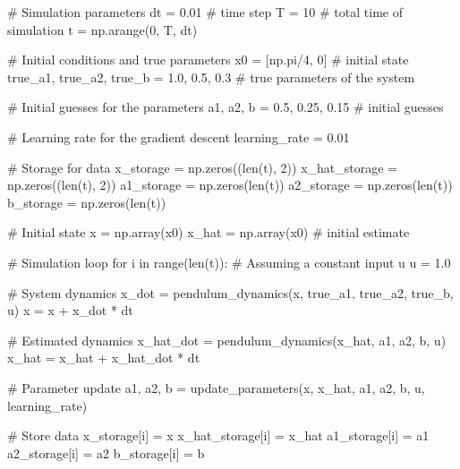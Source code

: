 \documentclass{article}
\begin{document}
\begin{python}
# Simulation parameters
dt = 0.01  # time step
T = 10     # total time of simulation
t = np.arange(0, T, dt)

# Initial conditions and true parameters
x0 = [np.pi/4, 0]  # initial state
true_a1, true_a2, true_b = 1.0, 0.5, 0.3  # true parameters of the system

# Initial guesses for the parameters
a1, a2, b = 0.5, 0.25, 0.15  # initial guesses

# Learning rate for the gradient descent
learning_rate = 0.01

# Storage for data
x_storage = np.zeros((len(t), 2))
x_hat_storage = np.zeros((len(t), 2))
a1_storage = np.zeros(len(t))
a2_storage = np.zeros(len(t))
b_storage = np.zeros(len(t))

# Initial state
x = np.array(x0)
x_hat = np.array(x0)  # initial estimate

# Simulation loop
for i in range(len(t)):
    # Assuming a constant input u
    u = 1.0

    # System dynamics
    x_dot = pendulum_dynamics(x, true_a1, true_a2, true_b, u)
    x = x + x_dot * dt

    # Estimated dynamics
    x_hat_dot = pendulum_dynamics(x_hat, a1, a2, b, u)
    x_hat = x_hat + x_hat_dot * dt

    # Parameter update
    a1, a2, b = update_parameters(x, x_hat, a1, a2, b, u, learning_rate)

    # Store data
    x_storage[i] = x
    x_hat_storage[i] = x_hat
    a1_storage[i] = a1
    a2_storage[i] = a2
    b_storage[i] = b
\end{python}
\end{document}
